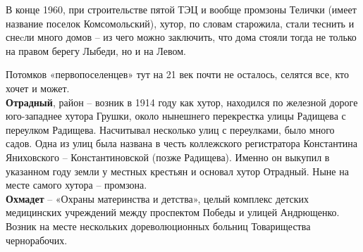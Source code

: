 В конце 1960, при строительстве пятой ТЭЦ и вообще промзоны Телички (имеет название поселок Комсомольский), хутор, по словам старожила, стали теснить и снеcли много домов – из чего можно заключить, что дома стояли тогда не только на правом берегу Лыбеди, но и на Левом.

Потомков «первопоселенцев» тут на 21 век почти не осталось, селятся все, кто хочет и может.\\

\textbf{Отрадный}, район – возник в 1914 году как хутор, находился по железной дороге юго-западнее хутора Грушки, около нынешнего перекрестка улицы Радищева с переулком Радищева. Насчитывал несколько улиц с переулками, было много садов. Одна из улиц была названа в честь коллежского регистратора Константина Яниховского – Константиновской (позже Радищева). Именно он выкупил в указанном году земли у местных крестьян и основал хутор Отрадный. Ныне на месте самого хутора – промзона.\\

\textbf{Охмадет} – «Охраны материнства и детства», целый комплекс детских медицинских учреждений между проспектом Победы и улицей Андрющенко. Возник на месте нескольких дореволюционных больниц Товарищества чернорабочих.\\



